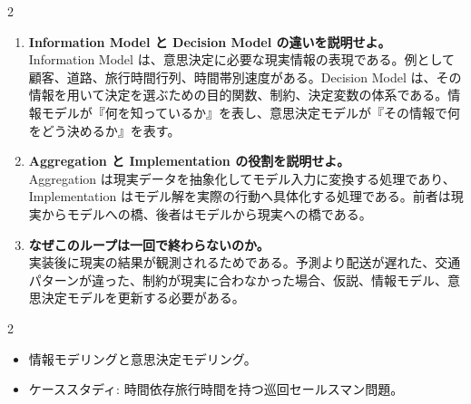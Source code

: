 \begin{multicols}{2}
\begin{enumerate}
\item \textbf{Information Model と Decision Model の違いを説明せよ。}\\
Information Model は、意思決定に必要な現実情報の表現である。例として顧客、道路、旅行時間行列、時間帯別速度がある。Decision Model は、その情報を用いて決定を選ぶための目的関数、制約、決定変数の体系である。情報モデルが『何を知っているか』を表し、意思決定モデルが『その情報で何をどう決めるか』を表す。
\item \textbf{Aggregation と Implementation の役割を説明せよ。}\\
Aggregation は現実データを抽象化してモデル入力に変換する処理であり、Implementation はモデル解を実際の行動へ具体化する処理である。前者は現実からモデルへの橋、後者はモデルから現実への橋である。
\item \textbf{なぜこのループは一回で終わらないのか。}\\
実装後に現実の結果が観測されるためである。予測より配送が遅れた、交通パターンが違った、制約が現実に合わなかった場合、仮説、情報モデル、意思決定モデルを更新する必要がある。
\end{enumerate}

\end{multicols}

\clearpage



\vspace{1.5mm}

\begin{multicols}{2}

\footnotesize

\raggedcolumns


\begin{itemize}
\item 情報モデリングと意思決定モデリング。
\item ケーススタディ: 時間依存旅行時間を持つ巡回セールスマン問題。
\end{itemize}

\end{multicols}

\clearpage


